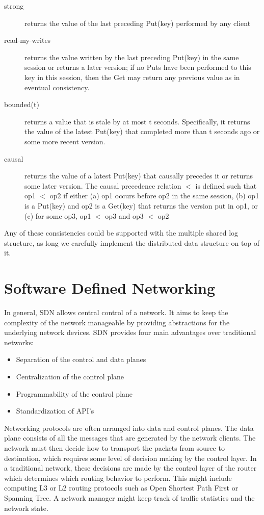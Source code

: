 \documentclass[letterpaper,twocolumn,10pt]{article}
\begin{document}
\begin{description}
\item[strong] returns the value of the last preceding Put(key) performed by any client
\item[read-my-writes] returns the value written by the last preceding Put(key) in the same session or returns a later version; if no Puts have been performed to this key in this session, then the Get may return any previous value as in eventual consistency.
\item[bounded(t)] returns a value that is stale by at most t seconds. Specifically, it returns the value of the latest Put(key) that completed more than t seconds ago or some more recent version.
\item[causal] returns the value of a latest Put(key) that causally precedes it or returns some later version. The causal precedence relation $<$ is defined such that op1 $<$ op2 if either
(a) op1 occurs before op2 in the same session,
(b) op1 is a Put(key) and op2 is a Get(key) that
returns the version put in op1, or
(c) for some op3, op1 $<$ op3 and op3 $<$ op2
\end{description}

Any of these consistencies could be supported with the multiple shared log structure, as long we carefully implement the distributed data structure on top of it.

\section{Software Defined Networking}

In general, SDN allows central control of a network. It aims to keep the complexity of the network manageable by providing abstractions for the underlying network devices. SDN provides four main advantages over traditional networks:

\begin{itemize}
\item Separation of the control and data planes
\item Centralization of the control plane
\item Programmability of the control plane
\item Standardization of API's
\end{itemize}
\cite{SDN}

Networking protocols are often arranged into data and control planes. The data plane consists of all the messages that are generated by the network clients. The network must then decide how to transport the packets from source to destination, which requires some level of decision making by the control layer. In a traditional network, these decisions are made by the control layer of the router which determines which routing behavior to perform. This might include computing L3 or L2
routing protocols such as Open Shortest Path First or Spanning Tree. A network manager might keep track of traffic statistics and the network state.
\end{document}
